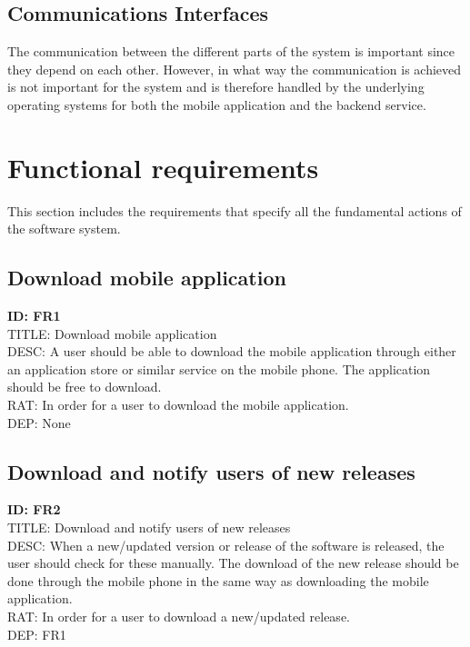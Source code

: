 \documentclass{scrreprt}
\begin{document}
\subsection{Communications Interfaces}
The communication between the different parts of the system is important since they depend on each
other. However, in what way the communication is achieved is not important for the system and is
therefore handled by the underlying operating systems for both the mobile application and the backend service.

\section{Functional requirements}
This section includes the requirements that specify all the fundamental actions of the software system.
\subsection{Download mobile application}
\textbf{ID: FR1}\\
TITLE: Download mobile application\\
DESC: A user should be able to download the mobile application through either an application store or
similar service on the mobile phone. The application should be free to download.\\
RAT: In order for a user to download the mobile application.\\
DEP: None

\subsection{Download and notify users of new releases}
\textbf{ID: FR2}\\
TITLE: Download and notify users of new releases\\
DESC: When a new/updated version or release of the software is released, the user should check for these
manually. The download of the new release should be done through the mobile phone in the same way as
downloading the mobile application.\\
RAT: In order for a user to download a new/updated release.\\
DEP: FR1
\end{document}
